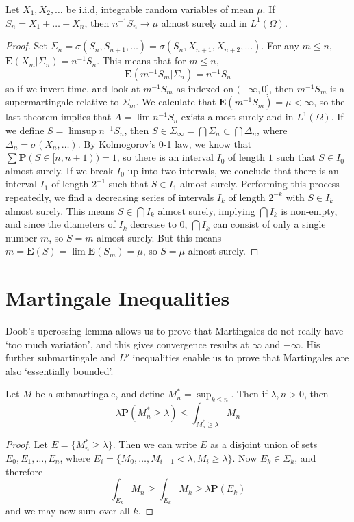 \begin{corollary}
    Let $X_1, X_2, \dots$ be i.i.d, integrable random variables of mean $\mu$. If $S_n = X_1 + \dots + X_n$, then $n^{-1}S_n \to \mu$ almost surely and in $L^1(\Omega)$.
\end{corollary}
\begin{proof}
    Set $\Sigma_n = \sigma(S_n,S_{n+1}, \dots) = \sigma(S_n, X_{n+1}, X_{n+2}, \dots)$. For any $m \leq n$, $\mathbf{E}(X_m|\Sigma_n) = n^{-1}S_n$. This means that for $m \leq n$,
    \[ \mathbf{E}(m^{-1}S_m|\Sigma_n) = n^{-1}S_n \]
    so if we invert time, and look at $m^{-1}S_m$ as indexed on $(-\infty,0]$, then $m^{-1}S_m$ is a supermartingale relative to $\Sigma_m$. We calculate that $\mathbf{E}(m^{-1}S_m) = \mu < \infty$, so the last theorem implies that $A = \lim n^{-1}S_n$ exists almost surely and in $L^1(\Omega)$. If we define $S = \limsup n^{-1}S_n$, then $S \in \Sigma_\infty = \bigcap \Sigma_n \subset \bigcap \Delta_n$, where $\Delta_n = \sigma(X_n, \dots)$. By Kolmogorov's 0-1 law, we know that $\sum \mathbf{P}(S \in [n,n+1)) = 1$, so there is an interval $I_0$ of length $1$ such that $S \in I_0$ almost surely. If we break $I_0$ up into two intervals, we conclude that there is an interval $I_1$ of length $2^{-1}$ such that $S \in I_1$ almost surely. Performing this process repeatedly, we find a decreasing series of intervals $I_k$ of length $2^{-k}$ with $S \in I_k$ almost surely. This means $S \in \bigcap I_k$ almost surely, implying $\bigcap I_k$ is non-empty, and since the diameters of $I_k$ decrease to $0$, $\bigcap I_k$ can consist of only a single number $m$, so $S = m$ almost surely. But this means $m = \mathbf{E}(S) = \lim \mathbf{E}(S_m) = \mu$, so $S = \mu$ almost surely.
\end{proof}

\section{Martingale Inequalities}

Doob's upcrossing lemma allows us to prove that Martingales do not really have `too much variation', and this gives convergence results at $\infty$ and $-\infty$. His further submartingale and $L^p$ inequalities enable us to prove that Martingales are also `essentially bounded'.

\begin{theorem}
    Let $M$ be a submartingale, and define $M^*_n = \sup_{k \leq n}$. Then if $\lambda, n > 0$, then
    \[ \lambda \mathbf{P} \left( M^*_n \geq \lambda \right) \leq \int_{M^*_n \geq \lambda} M_n \]
\end{theorem}
\begin{proof}
    Let $E = \{ M^*_n \geq \lambda \}$. Then we can write $E$ as a disjoint union of sets $E_0,E_1,\dots, E_n$, where $E_i = \{ M_0, \dots, M_{i-1} < \lambda, M_i \geq \lambda \}$. Now $E_k \in \Sigma_k$, and therefore
    \[ \int_{E_k} M_n \geq \int_{E_k} M_k \geq \lambda \mathbf{P}(E_k) \]
    and we may now sum over all $k$.
\end{proof}

